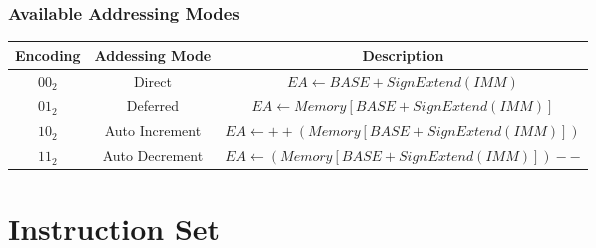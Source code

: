 \documentclass{article}
\begin{document}
\subsubsection{Available Addressing Modes}
\begin{center}
\begin{tabular}{|c|c|c|}
    \hline
    Encoding & Addessing Mode & Description \\
    \hline
    $00_2$ & Direct & $EA \leftarrow BASE + SignExtend(IMM)$ \\
    \hline
    $01_2$ & Deferred & $EA \leftarrow Memory[BASE + SignExtend(IMM)]$ \\
    \hline
    $10_2$ & Auto Increment & $EA \leftarrow ++(Memory[BASE + SignExtend(IMM)])$ \\
    \hline
    $11_2$ & Auto Decrement & $EA \leftarrow (Memory[BASE + SignExtend(IMM)])--$\\
    \hline
\end{tabular}
\end{center}

\pagebreak
\section{Instruction Set}
 








 

\end{document}
